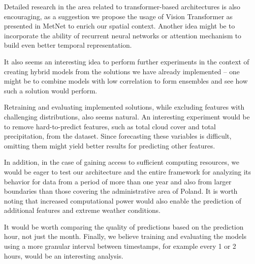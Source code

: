 Detailed research in the area related to transformer-based architectures is also encouraging, as a suggestion we propose the usage of Vision Transformer as presented in MetNet to enrich our spatial context. Another idea might be to incorporate the ability of recurrent neural networks or attention mechanism to build even better temporal representation. 


It also seems an interesting idea to perform further experiments in the context of creating hybrid models from the solutions we have already implemented -- one might be to combine models with low correlation to form ensembles and see how such a solution would perform. 

Retraining and evaluating implemented solutions, while excluding features with challenging distributions, also seems natural. An interesting experiment would be to remove hard-to-predict features, such as total cloud cover and total precipitation, from the dataset. Since forecasting these variables is difficult, omitting them might yield better results for predicting other features.

In addition, in the case of gaining access to sufficient computing resources, we would be eager to test our architecture and the entire framework for analyzing its behavior for data from a period of more than one year and also from larger boundaries than those covering the administrative area of Poland. It is worth noting that increased computational power would also enable the prediction of additional features and extreme weather conditions.

It would be worth comparing the quality of predictions based on the prediction hour, not just the month. Finally, we believe training and evaluating the models using a more granular interval between timestamps, for example every 1 or 2 hours, would be an interesting analysis.
